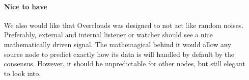 \paragraph{Nice to have} We also would like that Overclouds was designed to not act like random noises. Preferably, external and internal listener or watcher should see a nice mathematically driven signal. The mathemagical behind it would allow any source node to predict exactly how its data is will handled by default by the consensus. However, it should be unpredictable for other nodes, but still elegant to look into.

